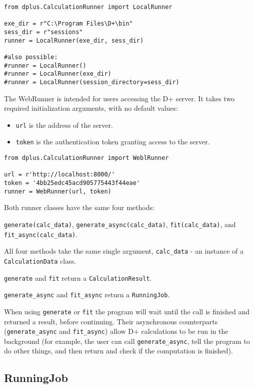 \documentclass[../D+Manual.tex]{subfiles}
\begin{document}
\begin{lstlisting}[style=pythonstyle]
from dplus.CalculationRunner import LocalRunner

exe_dir = r"C:\Program Files\D+\bin"
sess_dir = r"sessions"
runner = LocalRunner(exe_dir, sess_dir)

#also possible:
#runner = LocalRunner()
#runner = LocalRunner(exe_dir)
#runner = LocalRunner(session_directory=sess_dir)
\end{lstlisting}

The WebRunner is intended for users accessing the D+ server. It takes
two required initialization arguments, with no default values:

\begin{itemize}
	\tightlist
	\item
	\texttt{url} is the address of the server.
	\item
	\texttt{token} is the authentication token granting access to the
	server.
\end{itemize}

\begin{lstlisting}[style=pythonstyle]
from dplus.CalculationRunner import WeblRunner

url = r'http://localhost:8000/'
token = '4bb25edc45acd905775443f44eae'
runner = WebRunner(url, token)
\end{lstlisting}

Both runner classes have the same four methods:

\texttt{generate(calc\_data)}, \texttt{generate\_async(calc\_data)}, \texttt{fit(calc\_data)}, and \texttt{fit\_async(calc\_data)}.

All four methods take the same single argument, \texttt{calc\_data} - an
instance of a \texttt{CalculationData} class.

\texttt{generate} and \texttt{fit} return a \texttt{CalculationResult}.

\texttt{generate\_async} and \texttt{fit\_async} return a \texttt{RunningJob}.

When using \texttt{generate} or \texttt{fit} the program will wait until the call is finished and returned a result, before continuing. Their asynchronous counterparts (\texttt{generate\_async} and \texttt{fit\_async}) allow D+ 
calculations to be run in the background (for example, the user can call \texttt{generate\_async}, tell the program to do other things, and then return and check if the computation is finished). 


\subsection{RunningJob}\label{runningjob}
\end{document}
